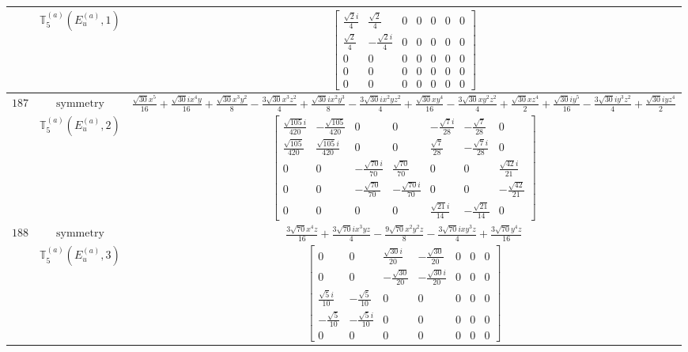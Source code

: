 \documentclass[fleqn,8pt,landscape]{jsarticle}
\begin{document}
\begin{longtable}{ccc}
$  $ & $ \mathbb{T}_{5}^{(a)}(E_{u}^{(a)},1) $ & $ \begin{bmatrix} \frac{\sqrt{2} i}{4} & \frac{\sqrt{2}}{4} & 0 & 0 & 0 & 0 & 0 \\ \frac{\sqrt{2}}{4} & - \frac{\sqrt{2} i}{4} & 0 & 0 & 0 & 0 & 0 \\ 0 & 0 & 0 & 0 & 0 & 0 & 0 \\ 0 & 0 & 0 & 0 & 0 & 0 & 0 \\ 0 & 0 & 0 & 0 & 0 & 0 & 0 \end{bmatrix} $ \\ \hline
$ 187 $ & $ \text{symmetry} $ & $ \frac{\sqrt{30} x^{5}}{16} + \frac{\sqrt{30} i x^{4} y}{16} + \frac{\sqrt{30} x^{3} y^{2}}{8} - \frac{3 \sqrt{30} x^{3} z^{2}}{4} + \frac{\sqrt{30} i x^{2} y^{3}}{8} - \frac{3 \sqrt{30} i x^{2} y z^{2}}{4} + \frac{\sqrt{30} x y^{4}}{16} - \frac{3 \sqrt{30} x y^{2} z^{2}}{4} + \frac{\sqrt{30} x z^{4}}{2} + \frac{\sqrt{30} i y^{5}}{16} - \frac{3 \sqrt{30} i y^{3} z^{2}}{4} + \frac{\sqrt{30} i y z^{4}}{2} $ \\
$  $ & $ \mathbb{T}_{5}^{(a)}(E_{u}^{(a)},2) $ & $ \begin{bmatrix} \frac{\sqrt{105} i}{420} & - \frac{\sqrt{105}}{420} & 0 & 0 & - \frac{\sqrt{7} i}{28} & - \frac{\sqrt{7}}{28} & 0 \\ \frac{\sqrt{105}}{420} & \frac{\sqrt{105} i}{420} & 0 & 0 & \frac{\sqrt{7}}{28} & - \frac{\sqrt{7} i}{28} & 0 \\ 0 & 0 & - \frac{\sqrt{70} i}{70} & \frac{\sqrt{70}}{70} & 0 & 0 & \frac{\sqrt{42} i}{21} \\ 0 & 0 & - \frac{\sqrt{70}}{70} & - \frac{\sqrt{70} i}{70} & 0 & 0 & - \frac{\sqrt{42}}{21} \\ 0 & 0 & 0 & 0 & \frac{\sqrt{21} i}{14} & - \frac{\sqrt{21}}{14} & 0 \end{bmatrix} $ \\ \hline
$ 188 $ & $ \text{symmetry} $ & $ \frac{3 \sqrt{70} x^{4} z}{16} + \frac{3 \sqrt{70} i x^{3} y z}{4} - \frac{9 \sqrt{70} x^{2} y^{2} z}{8} - \frac{3 \sqrt{70} i x y^{3} z}{4} + \frac{3 \sqrt{70} y^{4} z}{16} $ \\
$  $ & $ \mathbb{T}_{5}^{(a)}(E_{u}^{(a)},3) $ & $ \begin{bmatrix} 0 & 0 & \frac{\sqrt{30} i}{20} & - \frac{\sqrt{30}}{20} & 0 & 0 & 0 \\ 0 & 0 & - \frac{\sqrt{30}}{20} & - \frac{\sqrt{30} i}{20} & 0 & 0 & 0 \\ \frac{\sqrt{5} i}{10} & - \frac{\sqrt{5}}{10} & 0 & 0 & 0 & 0 & 0 \\ - \frac{\sqrt{5}}{10} & - \frac{\sqrt{5} i}{10} & 0 & 0 & 0 & 0 & 0 \\ 0 & 0 & 0 & 0 & 0 & 0 & 0 \end{bmatrix} $ \\ \hline

\end{longtable}
\end{document}
